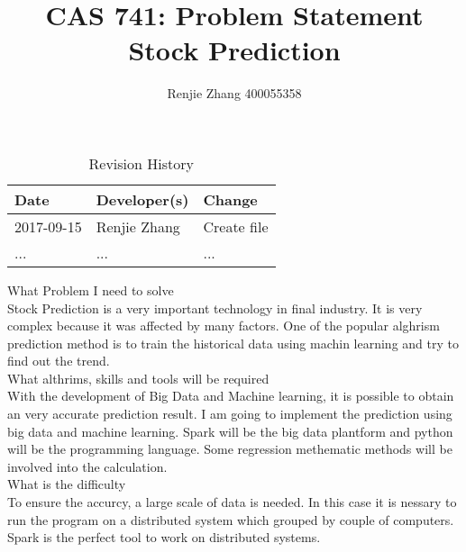 \documentclass[12pt]{article}
\title{CAS 741: Problem Statement\\Stock Prediction\\}
\author{Renjie Zhang  400055358}
\begin{document}
\maketitle

\begin{table}[hp]
\caption{Revision History} \label{TblRevisionHistory}
\begin{tabularx}{\textwidth}{llX}
\toprule
\textbf{Date} & \textbf{Developer(s)} & \textbf{Change}\\
\midrule
2017-09-15 & Renjie Zhang & Create file\\

... & ... & ...\\
\bottomrule
\end{tabularx}
\end{table}

What Problem I need to solve\\
Stock Prediction is a very important technology in final industry. It is very complex because it was affected by many factors.  One of the popular alghrism prediction method is to train the historical data using machin learning and try to find out the trend. \\

What althrims, skills and tools will be required\\
With the development of Big Data and Machine learning, it is possible to obtain an very accurate prediction result. I am going to implement the prediction using big data and machine learning. Spark will be the big data plantform and python will be the programming language. Some regression methematic methods will be involved  into the calculation.\\


What is the difficulty\\
To ensure the accurcy, a large scale of data is needed. In this case it is nessary to run the program on a distributed system which grouped by couple of computers. Spark is the perfect tool to work on distributed systems.\\

\end{document}
